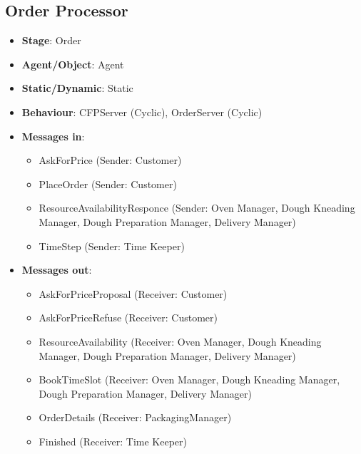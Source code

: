 \documentclass[12pt]{article}
\begin{document}
\subsection{Order Processor}%
\label{sub:order_processor}
\begin{itemize}
    \item \textbf{Stage}: Order
    \item \textbf{Agent/Object}: Agent
    \item \textbf{Static/Dynamic}: Static
    \item \textbf{Behaviour}: CFPServer (Cyclic), OrderServer (Cyclic)
    \item \textbf{Messages in}:
        \begin{itemize}
            \item AskForPrice (Sender: Customer)
            \item PlaceOrder (Sender: Customer)
            \item ResourceAvailabilityResponce (Sender: Oven Manager, Dough Kneading Manager, Dough Preparation Manager, Delivery Manager)
            \item TimeStep (Sender: Time Keeper)
        \end{itemize}
    \item \textbf{Messages out}:
        \begin{itemize}
            \item AskForPriceProposal (Receiver: Customer)
            \item AskForPriceRefuse (Receiver: Customer)
            \item ResourceAvailability (Receiver: Oven Manager, Dough Kneading Manager, Dough Preparation Manager, Delivery Manager)
            \item BookTimeSlot (Receiver: Oven Manager, Dough Kneading Manager, Dough Preparation Manager, Delivery Manager)
            \item OrderDetails (Receiver: PackagingManager)
            \item Finished (Receiver: Time Keeper)
        \end{itemize}
\end{itemize}
\end{document}
